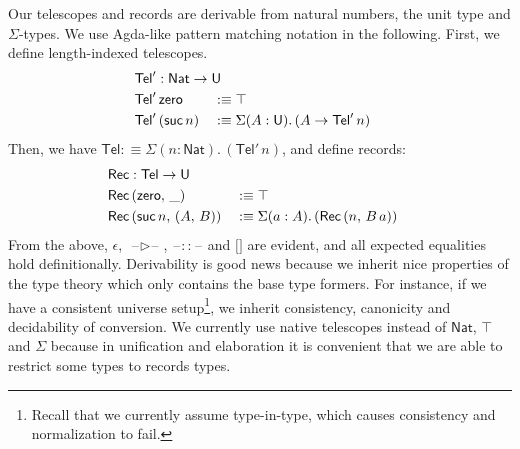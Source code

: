 \documentclass[acmsmall,review,anonymous,prologue,dvipsnames]{acmart}\settopmatter{printfolios=true,printccs=false,printacmref=false}
\renewcommand{\U}{\mathsf{U}}
\newcommand{\blank}{\mathord{\hspace{1pt}\text{--}\hspace{1pt}}}
\newcommand{\Nat}{\mathsf{Nat}}
\newcommand{\zero}{\mathsf{zero}}
\newcommand{\suc}{\mathsf{suc}}
\newcommand{\Tel}{\mathsf{Tel}}
\newcommand{\TCons}{\triangleright}
\newcommand{\Rec}{\mathsf{Rec}}
\theoremstyle{remark}
\begin{document}
Our telescopes and records are derivable from natural numbers, the unit type and
$\Sigma$-types. We use Agda-like pattern matching notation in the following.
First, we define length-indexed telescopes.
\begin{alignat*}{3}
  & \rlap{$\Tel' : \Nat \to \U$}\\
  & \Tel'\,\zero      && :\equiv \top\\
  & \Tel'\,(\suc\,n)  && :\equiv \Sigma(A : \U).\,(A \to \Tel'\,n)
\end{alignat*}
Then, we have $\Tel :\equiv \Sigma(n : \Nat).\,(\Tel'\,n)$, and define records:
\begin{alignat*}{3}
  & \rlap{$\Rec : \Tel \to \U$}\\
  & \Rec\,(\zero,\,\_)        &&:\equiv \top\\
  & \Rec\,(\suc\,n,\,(A,\,B)) &&:\equiv \Sigma(a : A).\,(\Rec\,(n,\,B\,a))
\end{alignat*}
From the above, $\epsilon$, $\blank\TCons\blank$, $\blank::\blank$ and ${[}{]}$
are evident, and all expected equalities hold definitionally. Derivability is
good news because we inherit nice properties of the type theory which only
contains the base type formers. For instance, if we have a consistent universe
setup\footnote{Recall that we currently assume type-in-type, which causes consistency and normalization to fail.}, we inherit consistency, canonicity and decidability of conversion. We
currently use native telescopes instead of $\Nat$, $\top$ and $\Sigma$ because
in unification and elaboration it is convenient that we are able to restrict
some types to records types.
\end{document}
